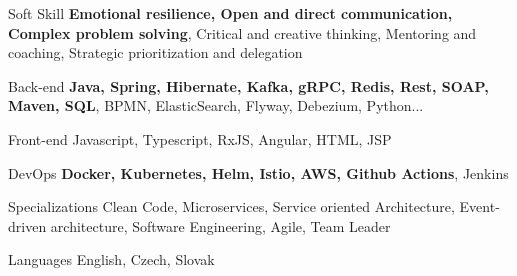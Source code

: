 

\begin{cvskills}

  \vspace{0.6em}
  \cvskill
  {Soft Skill} %
  {\textbf{Emotional resilience, Open and direct communication, Complex problem solving}, Critical and creative thinking, Mentoring and coaching, Strategic prioritization and delegation} %

  \cvskill
  {Back-end} %
  {\textbf{Java, Spring, Hibernate, Kafka, gRPC, Redis, Rest, SOAP, Maven, SQL}, BPMN, ElasticSearch, Flyway, Debezium, Python...} %

  \cvskill
  {Front-end} %
  {Javascript, Typescript, RxJS, Angular, HTML, JSP} %

  \cvskill
  {DevOps} %
  {\textbf{Docker, Kubernetes, Helm, Istio, AWS, Github Actions}, Jenkins} %

  \cvskill
  {Specializations} %
  {Clean Code, Microservices, Service oriented Architecture, Event-driven architecture, Software Engineering, Agile,
    Team Leader} %

  \cvskill
  {Languages} %
  {English, Czech, Slovak} %

\end{cvskills}
